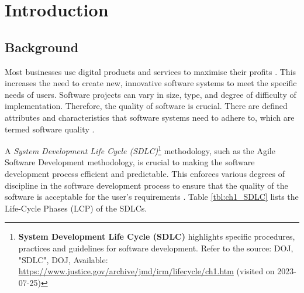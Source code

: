 \chapter{Introduction}
\label{chap:1}

\section{Background}\label{section:ch1_background}
Most businesses use digital products and services to maximise their profits \cite{Gralha2018}. This increases the need to create new, innovative software systems to meet the specific needs of users. Software projects can vary in size, type, and degree of difficulty of implementation. Therefore, the quality of software is crucial. There are defined attributes and characteristics that software systems need to adhere to, which are termed software quality \cite{Khan2013}. \par A \textit{System Development Life Cycle (SDLC)}\footnote{\textbf{System Development Life Cycle (SDLC)} highlights specific procedures, practices and guidelines for software development. Refer to the source: DOJ, "SDLC", DOJ, Available: \url{https://www.justice.gov/archive/jmd/irm/lifecycle/ch1.htm} (visited on 2023-07-25)} methodology, such as the Agile Software Development methodology, is crucial to making the software development process efficient and predictable. This enforces various degrees of discipline in the software development process to ensure that the quality of the software is acceptable for the user's requirements \cite{Khan2013, Al-Saiyd2015}. Table \ref{tbl:ch1_SDLC} lists the Life-Cycle Phases (LCP) of the SDLCs.

